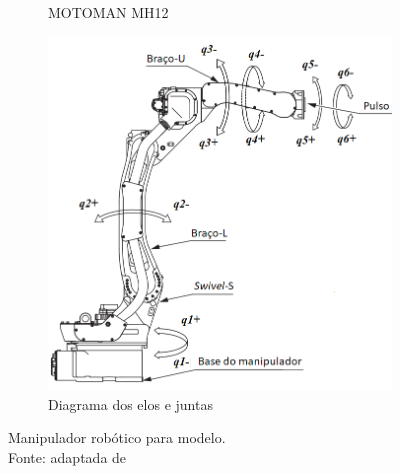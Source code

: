 \begin{figure}[h]
\begin{subfigure}[b]{0.3\textwidth}
        \caption{MOTOMAN MH12}
        \label{fig::mh12_foto}
    \end{subfigure}
    \quad %
    \begin{subfigure}[b]{0.5\textwidth}
        \includegraphics[width=\textwidth]{figs/mh12_diagram}
        \caption{Diagrama dos elos e juntas}
        \label{fig::mh12_diagram}
    \end{subfigure}
    \caption[Manipulador robótico para modelo]{Manipulador robótico para modelo.
    \\Fonte: adaptada de~\cite{manualmh12}}
    \label{fig::resumo_mh12}
\end{figure}

